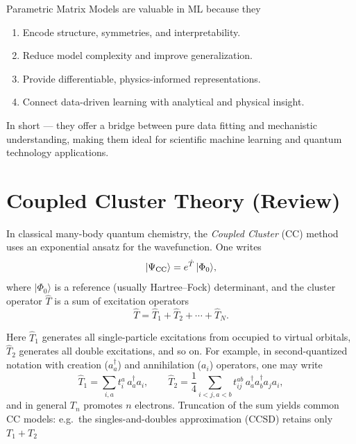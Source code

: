 \documentclass[twocolumn,superscriptaddress,unsortedaddress,nofootinbib,amsmath,amssymb,
aps,floatfix]{revtex4-2}
\begin{document}
Parametric Matrix Models are valuable in ML because they
\begin{enumerate}
\item Encode structure, symmetries, and interpretability.
\item Reduce model complexity and improve generalization.
\item Provide differentiable, physics-informed representations.
\item Connect data-driven learning with analytical and physical insight.
\end{enumerate}

In short — they offer a bridge between pure data fitting and
mechanistic understanding, making them ideal for scientific machine
learning and quantum technology applications.



\section{Coupled Cluster Theory (Review)}
In classical many-body quantum chemistry, the \emph{Coupled Cluster} (CC) method uses an exponential ansatz for the wavefunction.  One writes 
\begin{equation}
|\Psi_{\rm CC}\rangle = e^{\hat T}\,|\Phi_0\rangle,
\end{equation}
where $|\Phi_0\rangle$ is a reference (usually Hartree--Fock) determinant, and the cluster operator $\hat T$ is a sum of excitation operators 
\begin{equation}
\hat T = \hat T_1 + \hat T_2 + \cdots + \hat T_N.
\end{equation}

Here $\hat T_1$ generates all single-particle excitations from
occupied to virtual orbitals, $\hat T_2$ generates all double
excitations, and so on.  For example, in second-quantized notation
with creation ($a^\dagger_a$) and annihilation ($a_i$) operators, one
may write
\[
\hat T_1 = \sum_{i,a} t_i^a\,a^\dagger_a a_i,\qquad
\hat T_2 = \frac{1}{4}\sum_{i<j,a<b} t_{ij}^{ab}\,a^\dagger_a a^\dagger_b a_j a_i,
\]
and in general $T_n$ promotes $n$ electrons.  Truncation of the sum yields common CC models: e.g.\ the singles-and-doubles approximation (CCSD) retains only $T_1+T_2$
\end{document}
